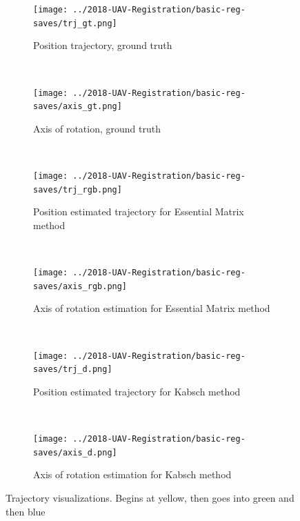 \documentclass[12pt,a4paper]{article}
\begin{document}
\begin{figure}[p]
  \centering
  \begin{subfigure}[t]{0.5\textwidth}
  \centering
    \texttt{[image: ../2018-UAV-Registration/basic-reg-saves/trj\_gt.png]}
  \caption{Position trajectory, ground truth}
  \end{subfigure}%
  ~
  \begin{subfigure}[t]{0.5\textwidth}
  \centering
    \texttt{[image: ../2018-UAV-Registration/basic-reg-saves/axis\_gt.png]}
  \caption{Axis of rotation, ground truth}
  \end{subfigure}
  \\
  \begin{subfigure}[t]{0.5\textwidth}
  \centering
    \texttt{[image: ../2018-UAV-Registration/basic-reg-saves/trj\_rgb.png]}
  \caption{Position estimated trajectory for Essential Matrix method}
  \end{subfigure}%
  ~
  \begin{subfigure}[t]{0.5\textwidth}
  \centering
    \texttt{[image: ../2018-UAV-Registration/basic-reg-saves/axis\_rgb.png]}
  \caption{Axis of rotation estimation for Essential Matrix method}
  \end{subfigure}
  \\
  \begin{subfigure}[t]{0.5\textwidth}
  \centering
    \texttt{[image: ../2018-UAV-Registration/basic-reg-saves/trj\_d.png]}
  \caption{Position estimated trajectory for Kabsch method}
  \end{subfigure}%
  ~
  \begin{subfigure}[t]{0.5\textwidth}
  \centering
    \texttt{[image: ../2018-UAV-Registration/basic-reg-saves/axis\_d.png]}
  \caption{Axis of rotation estimation for Kabsch method}
  \end{subfigure}
  \caption{Trajectory visualizations. Begins at yellow, then goes into green and then blue}
  \label{f: D415 offset}
\end{figure}
\end{document}
